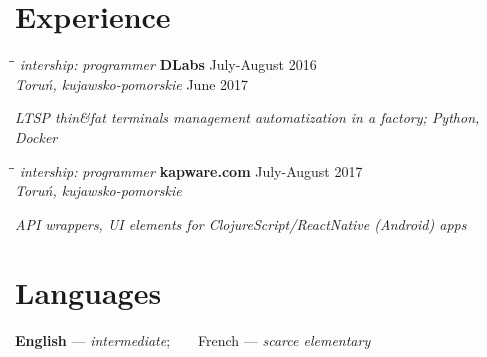 \documentclass[a4paper]{res}
\begin{document}
\begin{resume}
    \section{Experience}
    \vspace{-0.05in}
    \begin{tabbing}
        \hspace{2.3in}\= \hspace{2.6in}\= \kill
        \textit{intership:} \textsl{programmer}\>
        \textbf{DLabs} \>
        July-August 2016\\
        \> \textsl{Toruń, kujawsko-pomorskie}
        \> June 2017
    \end{tabbing}\vspace{-20pt}
    \hspace{.5in}\textsl{LTSP thin\&fat terminals management automatization in a factory; Python, Docker}
    \vspace{-0.17in}
    \begin{tabbing}
        \hspace{2.3in}\= \hspace{2.6in}\= \kill
        \textit{intership:} \textsl{programmer}\>
        \textbf{kapware.com} \>
        July-August 2017\\
        \> \textsl{Toruń, kujawsko-pomorskie}
    \end{tabbing}\vspace{-17pt}
    \hspace{.5in}\textsl{API wrappers, UI elements for ClojureScript/ReactNative (Android) apps}
    \vspace{-0.17in}
    \section{Languages}
    \vspace{0.05in}
    \textbf{English} — \textsl{intermediate}; ~ ~ French — \textsl{scarce elementary}
    \vspace{-0.18in}

\end{resume}
\end{document}
